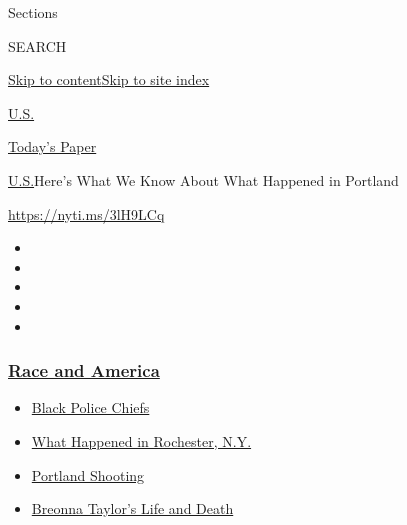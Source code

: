 Sections

SEARCH

\protect\hyperlink{site-content}{Skip to
content}\protect\hyperlink{site-index}{Skip to site index}

\href{https://www.nytimes3xbfgragh.onion/section/us}{U.S.}

\href{https://myaccount.nytimes3xbfgragh.onion/auth/login?response_type=cookie\&client_id=vi}{}

\href{https://www.nytimes3xbfgragh.onion/section/todayspaper}{Today's
Paper}

\href{/section/us}{U.S.}\textbar{}Here's What We Know About What
Happened in Portland

\url{https://nyti.ms/3lH9LCq}

\begin{itemize}
\item
\item
\item
\item
\item
\end{itemize}

\hypertarget{race-and-america}{%
\subsubsection{\texorpdfstring{\href{https://www.nytimes3xbfgragh.onion/news-event/george-floyd-protests-minneapolis-new-york-los-angeles?name=styln-george-floyd\&region=TOP_BANNER\&block=storyline_menu_recirc\&action=click\&pgtype=Article\&impression_id=75b95320-f52b-11ea-953b-e7f6208efedb\&variant=undefined}{Race
and America}}{Race and America}}\label{race-and-america}}

\begin{itemize}
\tightlist
\item
  \href{https://www.nytimes3xbfgragh.onion/2020/09/11/us/black-police-chiefs-reform.html?name=styln-george-floyd\&region=TOP_BANNER\&block=storyline_menu_recirc\&action=click\&pgtype=Article\&impression_id=75b95321-f52b-11ea-953b-e7f6208efedb\&variant=undefined}{Black
  Police Chiefs}
\item
  \href{https://www.nytimes3xbfgragh.onion/2020/09/04/nyregion/rochester-police-daniel-prude.html?name=styln-george-floyd\&region=TOP_BANNER\&block=storyline_menu_recirc\&action=click\&pgtype=Article\&impression_id=75b95322-f52b-11ea-953b-e7f6208efedb\&variant=undefined}{What
  Happened in Rochester, N.Y.}
\item
  \href{https://www.nytimes3xbfgragh.onion/2020/08/30/us/portland-shooting-explained.html?name=styln-george-floyd\&region=TOP_BANNER\&block=storyline_menu_recirc\&action=click\&pgtype=Article\&impression_id=75b97a30-f52b-11ea-953b-e7f6208efedb\&variant=undefined}{Portland
  Shooting}
\item
  \href{https://www.nytimes3xbfgragh.onion/2020/08/30/us/breonna-taylor-police-killing.html?name=styln-george-floyd\&region=TOP_BANNER\&block=storyline_menu_recirc\&action=click\&pgtype=Article\&impression_id=75b97a31-f52b-11ea-953b-e7f6208efedb\&variant=undefined}{Breonna
  Taylor's Life and Death}
\end{itemize}


